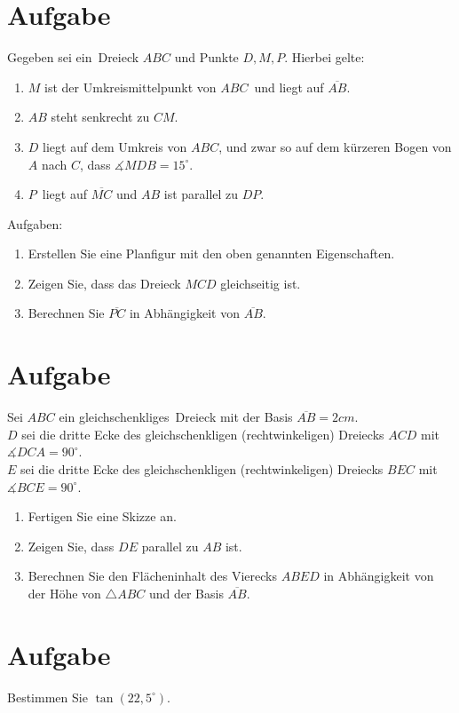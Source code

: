 \documentclass[a4paper,10pt]{article}
\begin{document}
\section{Aufgabe}
Gegeben sei ein Dreieck $ABC$ und Punkte $D,M,P$. Hierbei gelte:
\begin{enumerate}
\item $M$ ist der Umkreismittelpunkt von $ABC$ und liegt auf $\overline{AB}$.
\item $AB$ steht senkrecht zu $CM$.
\item $D$ liegt auf dem Umkreis von $ABC$, und zwar so auf dem kürzeren Bogen von $A$ nach $C$, dass $\measuredangle MDB=15^\circ$.
\item $P$ liegt auf $\overline{MC}$ und $AB$ ist parallel zu $DP$.
\end{enumerate}
Aufgaben:
\begin{enumerate}[label=\alph*)]
\item Erstellen Sie eine Planfigur mit den oben genannten Eigenschaften.
\item Zeigen Sie, dass das Dreieck $MCD$ gleichseitig ist.
\item Berechnen Sie $\overline{PC}$ in Abhängigkeit von $\overline{AB}$.
\end{enumerate}

\section{Aufgabe}
Sei $ABC$ ein gleichschenkliges Dreieck mit der Basis $\overline{AB} = 2cm$.\\
$D$ sei die dritte Ecke des gleichschenkligen (rechtwinkeligen) Dreiecks $ACD$ mit $\measuredangle DCA=90^\circ$.\\
$E$ sei die dritte Ecke des gleichschenkligen (rechtwinkeligen) Dreiecks $BEC$ mit $\measuredangle BCE=90^\circ$.
\begin{enumerate}[label=\alph*)]
\item Fertigen Sie eine Skizze an.
\item Zeigen Sie, dass $DE$ parallel zu $AB$ ist.
\item Berechnen Sie den Flächeninhalt des Vierecks $ABED$ in Abhängigkeit von der Höhe von $\triangle ABC$ und der Basis $\overline{AB}$.
\end{enumerate}

\section{Aufgabe}
Bestimmen Sie $\tan(22,5^\circ)$.
\end{document}
